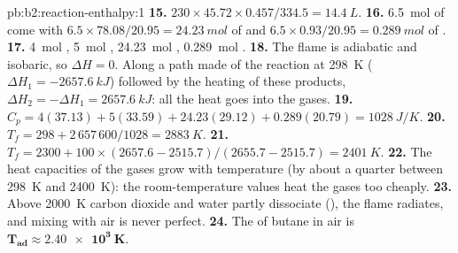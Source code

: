 \begin{solution}{pb:b2:reaction-enthalpy:1}
\textbf{15.} $230 \times 45.72 \times 0.457/334.5 = \qty{14.4}{L}$.
\textbf{16.} \qty{6.5}{mol} of  come with $6.5 \times 78.08/20.95 =
\qty{24.23}{mol}$ of  and $6.5 \times 0.93/20.95 = \qty{0.289}{mol}$
of .
\textbf{17.} \qty{4}{mol} , \qty{5}{mol} ,
\qty{24.23}{mol} , \qty{0.289}{mol} .
\textbf{18.} The flame is adiabatic and isobaric, so $\Delta H = 0$. Along a
path made of the reaction at \qty{298}{K} ($\Delta H_1 =
\qty{-2657.6}{kJ}$) followed by the heating of these products, $\Delta H_2 =
-\Delta H_1 = \qty{+2657.6}{kJ}$: all the heat goes into the gases.
\textbf{19.} $C_p = 4(37.13) + 5(33.59) + 24.23(29.12) + 0.289(20.79) =
\qty{1028}{J/K}$.
\textbf{20.} $T_f = 298 + 2\,657\,600/1028 = \qty{2883}{K}$.
\textbf{21.} $T_f = 2300 + 100 \times (2657.6 - 2515.7)/(2655.7 - 2515.7) =
\qty{2401}{K}$.
\textbf{22.} The heat capacities of the gases grow with temperature (by
about a quarter between \qty{298}{K} and \qty{2400}{K}): the room-temperature
values heat the gases too cheaply.
\textbf{23.} Above \qty{2000}{K} carbon dioxide and water partly dissociate
(), the flame radiates, and mixing with air is never perfect.
\textbf{24.} The  of butane in air is
$\boldsymbol{T_{\text{ad}} \approx \qty{2.40e3}{K}}$.
\end{solution}
